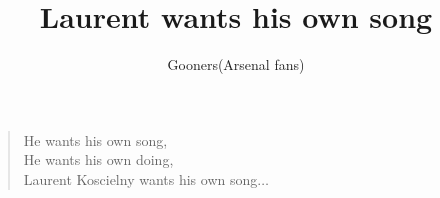\documentclass[a4paper,12pt]{article}
\title{Laurent wants his own song}
\author{Gooners(Arsenal fans)}
\date{}
\begin{document}
	
	\maketitle
	
	\begin{verse}
		
		He wants his own song, \\
		He wants his own doing, \\
		Laurent Koscielny wants his own song$\ldots$
		
	\end{verse}
	
\end{document}
